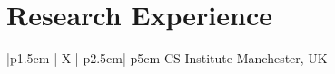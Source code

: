 \section{Research Experience}
\begin{mySectionContents}


\iftrue %
\begin{myTableEnv}{|p{1.5cm} | X | p{2.5cm}| p{5cm}}
    \myRow
        {\myPeriod}{}%
        {\researchInstitution}{CS Institute} %
    \myRow
        {}{} %
        {\myLocation}{Manchester, UK}%
     \end{myTableEnv}



\myTablesSeparator
\fi
\end{mySectionContents}
